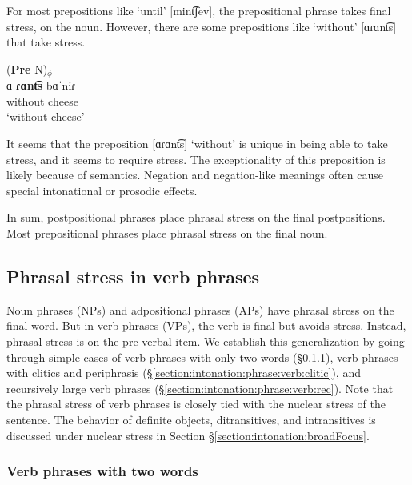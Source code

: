 For most prepositions like `until' [mint͡ʃev], the prepositional phrase takes final stress, on the noun. However,   there are some prepositions like `without' [ɑɾɑnt͡s] that take stress.



\begin{exe}
	\ex
	\begin{xlist}
		\ex \glll (\textbf{Pre} N)$_\phi$ \\
		ɑˈ\textbf{ɾɑnt͡s} bɑˈ{niɾ} \\
		without cheese\\
		\trans `without cheese'
		\\  
	\end{xlist}
\end{exe}

It seems that the  preposition [ɑɾɑnt͡s] `without' is unique in being able to take stress, and it seems to require stress. The exceptionality of this preposition is likely because of semantics. Negation and negation-like meanings often cause special intonational or prosodic effects. 


In sum, postpositional phrases place phrasal stress on the final postpositions. Most prepositional phrases place phrasal stress on the final noun. 


\subsection{Phrasal stress in verb phrases}\label{section:intonation:phrase:verb}

Noun phrases (NPs) and adpositional phrases (APs) have phrasal stress on the final word. But in verb phrases (VPs), the verb is final but avoids stress. Instead, phrasal stress is on the pre-verbal item.  We establish this generalization by going through simple cases of verb phrases with only two words (\S\ref{section:intonation:phrase:verb:two}), verb phrases with clitics and periphrasis (\S\ref{section:intonation:phrase:verb:clitic}), and recursively large verb phrases (\S\ref{section:intonation:phrase:verb:rec}). Note that the phrasal stress of verb phrases is closely tied with the nuclear stress of the sentence. The behavior of definite objects, ditransitives, and intransitives is discussed under nuclear stress in Section   \S\ref{section:intonation:broadFocus}. 

\subsubsection{Verb phrases with   two words}\label{section:intonation:phrase:verb:two}

